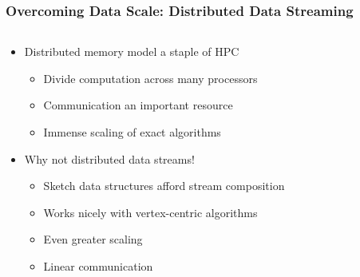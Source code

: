 \documentclass{beamer}
\begin{document}
\begin{frame}
\frametitle{Overcoming Data Scale: Distributed Data Streaming}


\begin{columns}
\begin{column}{0.65\textwidth}
	\begin{itemize}
		\item Distributed memory model a staple of HPC
		\begin{itemize}
			\item Divide computation across many processors
			\item Communication an important resource
			\item Immense scaling of exact algorithms
		\end{itemize}
		\item Why not distributed data streams!
		\begin{itemize}
			\item Sketch data structures afford stream composition
			\item Works nicely with vertex-centric algorithms
			\item Even greater scaling
			\item Linear communication
		\end{itemize}
	\end{itemize}
\end{column}
\begin{column}{0.35\textwidth}  %
\begin{center}

\end{center}
\end{column}
\end{columns}
\end{frame}
\end{document}
